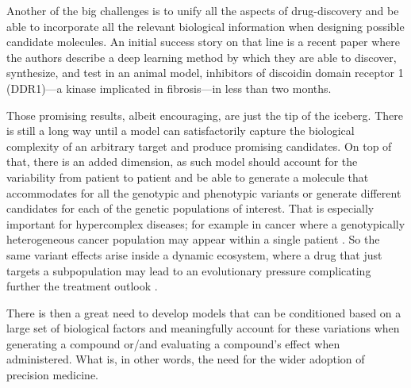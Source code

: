 \documentclass{article}
\begin{document}


Another of the big challenges is to unify all the aspects of drug-discovery and be able
 to incorporate all the relevant biological information when designing possible
 candidate molecules. An initial success story on that line is a recent paper
 \cite{Zhavoronkov2019} where the authors describe a deep learning method by which they
 are able to discover, synthesize, and test in an animal model, inhibitors of discoidin
 domain receptor 1 (DDR1)—a kinase implicated in fibrosis—in less than two months.

Those promising results, albeit encouraging, are just the tip of the iceberg. There is
still a long way until a model can satisfactorily capture the biological complexity of
an arbitrary target and produce promising candidates. On top of that, there is an added
dimension, as such model should account for the variability from patient to patient and
be able to generate a molecule that accommodates for all the genotypic and phenotypic
variants or generate different candidates for each of the genetic populations of
interest. That is especially important for hypercomplex diseases; for example in cancer
where a genotypically heterogeneous cancer population may appear within a single
patient \cite{Boland2017}. So the same variant effects arise inside a dynamic
ecosystem, where a drug that just targets a subpopulation may lead to an evolutionary
pressure complicating further the treatment outlook \cite{Enriquez-Navas2015}.

There is then a great need to develop models that can be conditioned based on a large
set of biological factors and meaningfully account for these variations when generating
a compound or/and evaluating a compound's effect when administered. What is, in other
words, the need for the wider adoption of precision medicine.
\end{document}
